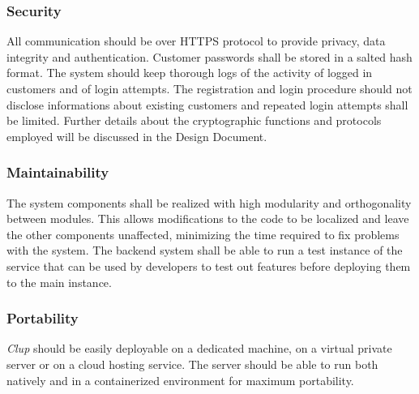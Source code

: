 \subsubsection{Security}
All communication should be over HTTPS protocol to provide privacy, data integrity and authentication.
Customer passwords shall be stored in a salted hash format.
The system should keep thorough logs of the activity of logged in customers and of login attempts. The registration and login procedure should not disclose informations about existing customers and repeated login attempts shall be limited.
Further details about the cryptographic functions and protocols employed will be discussed in the Design Document.
\subsubsection{Maintainability}
The system components shall be realized with high modularity and orthogonality between modules. This allows modifications to the code to be localized and leave the other components unaffected, minimizing the time required to fix problems with the system.
The backend system shall be able to run a test instance of the service that can be used by developers to test out features before deploying them to the main instance.
\subsubsection{Portability}
\textit{Clup} should be easily deployable on a dedicated machine, on a virtual private server or on a cloud hosting service. The server should be able to run both natively and in a containerized environment for maximum portability.
